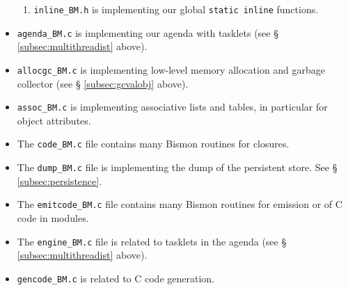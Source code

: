 \begin{itemize}
\begin{enumerate}
        \item \texttt{inline\_BM.h} is implementing our global \texttt{static
            inline} functions.
    \end{enumerate}

  \item \texttt{agenda\_BM.c} is implementing our agenda
     with tasklets  (see \S
    \ref{subsec:multithreadist} above).

  \item \texttt{allocgc\_BM.c} is implementing low-level memory
    allocation and garbage collector  (see \S
    \ref{subsec:gcvalobj} above).
  
  \item \texttt{assoc\_BM.c} is implementing associative lists and
           
    tables,    in
    particular for object attributes.

  \item The \texttt{code\_BM.c} file contains many Bismon routines for
           
     closures.

  \item The \texttt{dump\_BM.c} file is implementing the  dump of the
    persistent store.   See \S
      \ref{subsec:persistence}.

  \item The \texttt{emitcode\_BM.c} file contains many Bismon routines
    for  emission or  of C code in
     modules.

  \item The \texttt{engine\_BM.c} file is related to  tasklets 
     in the agenda (see \S
    \ref{subsec:multithreadist} above).

  \item \texttt{gencode\_BM.c} is related
     to C code
    generation.  


\end{itemize}
